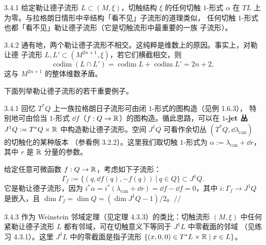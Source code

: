 \begin{wrem}{3.4.1}
给定勒让德子流形 $L\subset(M,\xi)$，切触结构 $\xi$ 的任何切触 $1$-形式
$\alpha$ 在 $TL$ 上为零。与拉格朗日情形中辛结构「看不见」子流形的道理类似，
任何切触 $1$-形式也都「看不见」勒让德子流形（它是切触流形中最重要的一族
子流形）。
\end{wrem}

\begin{wrem}{3.4.2}
通有地，两个勒让德子流形不相交。这纯粹是维数上的原因。事实上，对勒让德
子流形 $L,L'\subset(M^{2n+1},\xi)$，若它们横截相交，则
\[
  \operatorname{codim}(L\cap L')
  =\operatorname{codim}L+\operatorname{codim}L'=2n+2,
\]
这与 $M^{2n+1}$ 的整体维数矛盾。
\end{wrem}

下面列举勒让德子流形的若干重要例子。

\begin{wexam}{3.4.1}
回忆 $T^*Q$ 上一族拉格朗日子流形可由闭 $1$-形式的图构造（见例 1.6.3），
特别地可由恰当 $1$-形式 $\dd f$（$f:Q\to\mathbb{R}$）的图构造。循此思路，可以在
\textbf{$1$-jet 丛} $J^1Q:=T^*Q\times\mathbb{R}$ 中构造勒让德子流形。空间
$J^1Q$ 可看作余切丛 $(T^*Q,\dd\lambda_{\mathrm{can}})$ 的切触化的某种版本
（参看例 3.2.2）。这里我们取切触 $1$-形式为
$\alpha:=\lambda_{\mathrm{can}}+\dd r$，其中 $r$ 是 $\mathbb{R}$ 分量的参数。

给定任意可微函数 $f:Q\to\mathbb{R}$，考虑如下子流形：
\[
  \Gamma_f:=\bigl\{(q,\dd f(q),-f(q))\ \big|\ q\in Q\bigr\}\subset J^1Q .
\]
它是勒让德子流形，因为
$i^*\alpha=i^*(\lambda_{\mathrm{can}}+\dd r)=\dd f-\dd f=0$，其中
$i:\Gamma_f\to J^1Q$ 是嵌入，且
$\dim\Gamma_f=\dim Q=(\dim J^1Q-1)/2$。\hfill$//$
\end{wexam}

\begin{wrem}{3.4.3}
作为 Weinstein 邻域定理（见定理 4.3.3）的类比：切触流形 $(M,\xi)$ 中任何
紧勒让德子流形 $L$ 都有邻域，可在切触意义下等同于 $J^1L$ 中零截面的邻域
（见练习 4.3.1）。这里 $J^1L$ 中的零截面是指子流形
$\{(x,0,0)\in T^*L\times\mathbb{R}\mid x\in L\}$。
\end{wrem}

